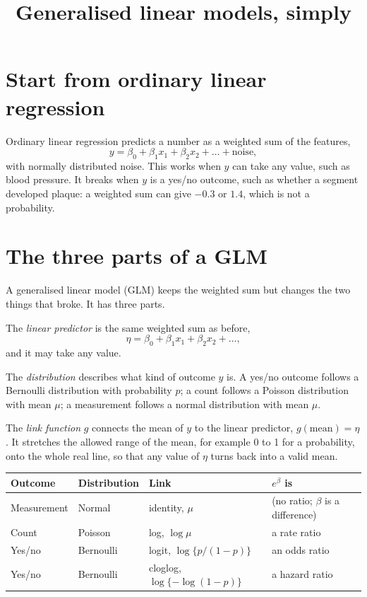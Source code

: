 \documentclass[11pt]{article}
\title{Generalised linear models, simply}
\date{}
\begin{document}
\maketitle

\section*{Start from ordinary linear regression}

Ordinary linear regression predicts a number as a weighted sum of the
features,
\[
  y = \beta_0 + \beta_1 x_1 + \beta_2 x_2 + \dots + \text{noise},
\]
with normally distributed noise. This works when $y$ can take any value, such
as blood pressure. It breaks when $y$ is a yes/no outcome, such as whether a
segment developed plaque: a weighted sum can give $-0.3$ or $1.4$, which is
not a probability.

\section*{The three parts of a GLM}

A generalised linear model (GLM) keeps the weighted sum but changes the two
things that broke. It has three parts.

The \emph{linear predictor} is the same weighted sum as before,
\[
  \eta = \beta_0 + \beta_1 x_1 + \beta_2 x_2 + \dots ,
\]
and it may take any value.

The \emph{distribution} describes what kind of outcome $y$ is. A yes/no
outcome follows a Bernoulli distribution with probability $p$; a count
follows a Poisson distribution with mean $\mu$; a measurement follows a
normal distribution with mean $\mu$.

The \emph{link function} $g$ connects the mean of $y$ to the linear
predictor, $g(\text{mean}) = \eta$. It stretches the allowed range of the
mean, for example 0 to 1 for a probability, onto the whole real line, so that
any value of $\eta$ turns back into a valid mean.

\begin{center}
\begin{tabular}{llll}
\toprule
Outcome & Distribution & Link & $e^{\beta}$ is \\
\midrule
Measurement & Normal    & identity, $\mu$                & (no ratio; $\beta$ is a difference) \\
Count       & Poisson   & log, $\log\mu$                 & a rate ratio \\
Yes/no      & Bernoulli & logit, $\log\{p/(1-p)\}$       & an odds ratio \\
Yes/no      & Bernoulli & cloglog, $\log\{-\log(1-p)\}$  & a hazard ratio \\
\bottomrule
\end{tabular}
\end{center}
\end{document}
